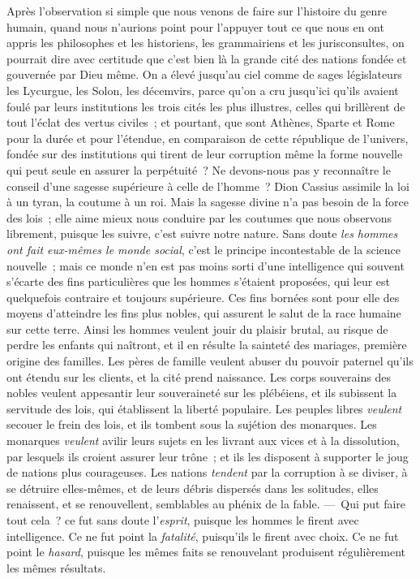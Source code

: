 \documentclass[french,twoside]{book} %
\begin{document}
Après l’observation si simple que nous venons de faire sur l’histoire du genre humain, quand nous n’aurions point pour l’appuyer tout ce que nous en ont appris les philosophes et les historiens, les grammairiens et les jurisconsultes, on pourrait dire avec certitude que c’est bien là la grande cité des nations fondée et gouvernée par Dieu même. On a élevé jusqu’au ciel comme de sages législateurs les Lycurgue, les Solon, les décemvirs, parce qu’on a  cru jusqu’ici qu’ils avaient foulé par leurs institutions les trois cités les plus illustres, celles qui brillèrent de tout l’éclat des vertus civiles ; et pourtant, que sont Athènes, Sparte et Rome pour la durée et pour l’étendue, en comparaison de cette république de l’univers, fondée sur des institutions qui tirent de leur corruption même la forme nouvelle qui peut seule en assurer la perpétuité ? Ne devons-nous pas y reconnaître le conseil d’une sagesse supérieure à celle de l’homme ? Dion Cassius assimile la loi à un tyran, la coutume à un roi. Mais la sagesse divine n’a pas besoin de la force des lois ; elle aime mieux nous conduire par les coutumes que nous observons librement, puisque les suivre, c’est suivre notre nature. Sans doute {\itshape les hommes ont fait eux-mêmes le monde social}, c’est le principe incontestable de la science nouvelle ; mais ce monde n’en est pas moins sorti d’une intelligence qui souvent s’écarte des fins particulières que les hommes s’étaient proposées, qui leur est quelquefois contraire et toujours supérieure. Ces fins bornées sont pour elle des moyens d’atteindre les fins plus nobles, qui assurent le salut de la race humaine sur cette terre. Ainsi les hommes veulent jouir du plaisir brutal, au risque de perdre les enfants qui naîtront, et il en résulte la sainteté des mariages, première origine des familles. Les pères de famille veulent abuser du pouvoir paternel qu’ils ont étendu sur les clients, et la cité prend naissance. Les corps souverains des nobles veulent appesantir leur souveraineté sur les plébéiens, et ils  subissent la servitude des lois, qui établissent la liberté populaire. Les peuples libres {\itshape veulent} secouer le frein des lois, et ils tombent sous la sujétion des monarques. Les monarques {\itshape veulent} avilir leurs sujets en les livrant aux vices et à la dissolution, par lesquels ils croient assurer leur trône ; et ils les disposent à supporter le joug de nations plus courageuses. Les nations {\itshape tendent} par la corruption à se diviser, à se détruire elles-mêmes, et de leurs débris dispersés dans les solitudes, elles renaissent, et se renouvellent, semblables au phénix de la fable. — Qui put faire tout cela ? ce fut sans doute l’{\itshape esprit}, puisque les hommes le firent avec intelligence. Ce ne fut point la {\itshape fatalité}, puisqu’ils le firent avec choix. Ce ne fut point le {\itshape hasard}, puisque les mêmes faits se renouvelant produisent régulièrement les mêmes résultats.\par
\end{document}
